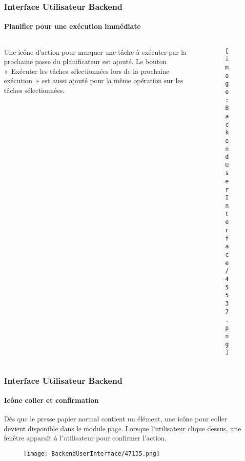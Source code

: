 \begin{frame}[fragile]
	\frametitle{Interface Utilisateur Backend}
	\framesubtitle{Planifier pour une exécution immédiate}

	\begin{columns}[T]
		\begin{column}{0.35\textwidth}
			Une icône d'action pour marquer une tâche à exécuter par la prochaine passe du
			planificateur est ajouté. Le bouton «~Exécuter les tâches sélectionnées lors de
			la prochaine exécution~» est aussi ajouté pour la même opération sur les tâches
			sélectionnées.
		\end{column}

		\begin{column}{0.65\textwidth}
			\begin{figure}\vspace{-0.6cm}
				\texttt{[image: BackendUserInterface/45537.png]}
			\end{figure}
		\end{column}
	\end{columns}

\end{frame}

\begin{frame}[fragile]
	\frametitle{Interface Utilisateur Backend}
	\framesubtitle{Icône coller et confirmation}

	Dès que le presse papier normal contient un élément, une icône pour coller devient
	disponible dans le module page. Lorsque l'utilisateur clique dessus, une fenêtre
	apparaît à l'utilisateur pour confirmer l'action.

	\begin{figure}\vspace{-0.2cm}
		\texttt{[image: BackendUserInterface/47135.png]}
	\end{figure}

\end{frame}

